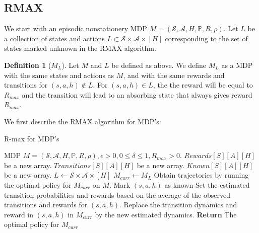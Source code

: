 \documentclass[12pt, letterpaper]{article}
\theoremstyle{definition}
\newtheorem*{defn}{Definition}
\theoremstyle{remark}
\begin{document}
\subsection{RMAX}

We start with an episodic nonstationery MDP \(M = (\mathcal{S}, \mathcal{A}, H, \mathbb{P}, R, \rho)\). Let \(L\) be a collection of states and actions \(L \subset \mathcal{S} \times \mathcal{A} \times [H]\) corresponding to the set of states marked unknown in the RMAX algorithm.

\begin{defn}[\(M_L\)]
    Let \(M\) and \(L\) be defined as above. We define \(M_L\) as a MDP with the same states and actions as \(M\), and with the same rewards and transitions for \((s, a, h) \notin L\). For \((s, a, h) \in L\), the the reward will be equal to \(R_{max}\) and the transition will lead to an absorbing state that always gives reward \(R_{max}\).
\end{defn}

We first describe the RMAX algorithm for MDP's:

\begin{algorithm}[H]
\caption{R-max for MDP's}
\begin{algorithmic}[1]
    \Require MDP \(M = (\mathcal{S}, \mathcal{A}, H, \mathbb{P}, R, \rho), \epsilon > 0, 0 \leq\delta \leq 1, R_{max} > 0\).
        \State $Rewards[S][A][H]$ be a new array.
        \State $Transitions[S][A][H]$ be a new array.
        \State $Known[S][A][H]$ be a new array.
        \State $L \gets \mathcal{S} \times \mathcal{A} \times [H]$
        \State $M_{curr} \gets M_L$
                \State Obtain trajectories by running the optimal policy for \(M_{curr}\) on \(M\).
                    \State Mark \((s, a, h)\) as known
                    \State Set the estimated transition probabilities and rewards based on the average of the observed transitions and rewards for \((s, a, h)\).
                    \State Replace the transition dynamics and reward in \((s, a, h)\) in \(M_{curr}\) by the new estimated dynamics.
                \EndIf
            \EndWhile
        \EndFor
        \State \textbf{Return} The optimal policy for \(M_{curr}\)

    \EndProcedure
    
\end{algorithmic}
\end{algorithm}
\end{document}
